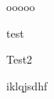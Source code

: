 \documentclass[a4paper]{article}
\theoremstyle{plain}
\begin{document}
\begin{theo}
    ooooo
\end{theo}

\begin{Theorem}
    test
\end{Theorem}

\begin{Definition}
    Test2
\end{Definition}
\begin{fdef}
    iklqjsdhf
\end{fdef}
\end{document}
